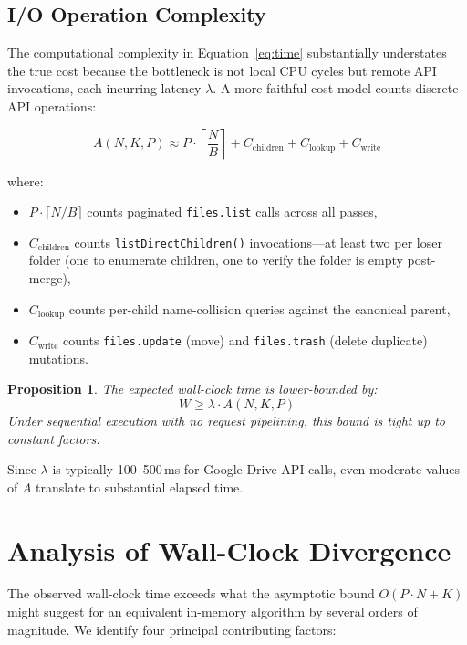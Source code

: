 \documentclass[12pt,a4paper]{article}
\newtheorem{proposition}[theorem]{Proposition}
\begin{document}
\subsection{I/O Operation Complexity}

The computational complexity in Equation~\eqref{eq:time} substantially understates the true cost because the bottleneck is not local CPU cycles but remote API invocations, each incurring latency $\lambda$. A more faithful cost model counts discrete API operations:

\begin{equation}
A(N, K, P) \approx P \cdot \left\lceil \frac{N}{B} \right\rceil + C_{\text{children}} + C_{\text{lookup}} + C_{\text{write}}
\label{eq:api}
\end{equation}

where:
\begin{itemize}[nosep]
  \item $P \cdot \lceil N/B \rceil$ counts paginated \texttt{files.list} calls across all passes,
  \item $C_{\text{children}}$ counts \texttt{listDirectChildren()} invocations---at least two per loser folder (one to enumerate children, one to verify the folder is empty post-merge),
  \item $C_{\text{lookup}}$ counts per-child name-collision queries against the canonical parent,
  \item $C_{\text{write}}$ counts \texttt{files.update} (move) and \texttt{files.trash} (delete duplicate) mutations.
\end{itemize}

\begin{proposition}
The expected wall-clock time is lower-bounded by:
\[
W \geq \lambda \cdot A(N, K, P)
\]
Under sequential execution with no request pipelining, this bound is tight up to constant factors.
\end{proposition}

Since $\lambda$ is typically 100--500\,ms for Google Drive API calls, even moderate values of $A$ translate to substantial elapsed time.


\section{Analysis of Wall-Clock Divergence}
\label{sec:bottleneck}

The observed wall-clock time exceeds what the asymptotic bound $O(P \cdot N + K)$ might suggest for an equivalent in-memory algorithm by several orders of magnitude. We identify four principal contributing factors:
\end{document}
